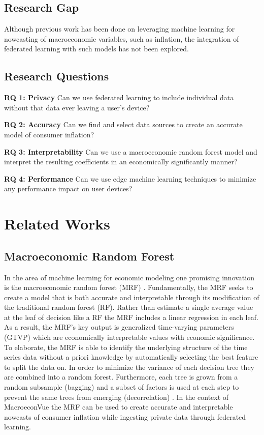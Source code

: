 \documentclass[conference]{IEEEtran}
\begin{document}
\subsection{Research Gap}
Although previous work has been done on leveraging machine learning for nowcasting of macroeconomic variables, such as inflation, the integration of federated learning with such models has not been explored.

\subsection{Research Questions}  
\textbf{RQ 1: Privacy} Can we use federated learning to include individual data without that data ever leaving a user's device?  

\textbf{RQ 2: Accuracy} Can we find and select data sources to create an accurate model of consumer inflation?  

\textbf{RQ 3: Interpretability} Can we use a macroeconomic random forest model and interpret the resulting coefficients in an economically significantly manner?  

\textbf{RQ 4: Performance} Can we use edge machine learning techniques to minimize any performance impact on user devices?  


\section{Related Works}
\subsection{Macroeconomic Random Forest}
In the area of machine learning for economic modeling one promising innovation is the macroeconomic random forest (MRF) \cite{macro_rf}. Fundamentally, the MRF seeks to create a model that is both accurate and interpretable through its modification of the traditional random forest (RF). Rather than estimate a single average value at the leaf of decision like a RF the MRF includes a linear regression in each leaf. As a result, the MRF's key output is generalized time-varying parameters (GTVP) which are economically interpretable values with economic significance. To elaborate, the MRF is able to identify the underlying structure of the time series data without a priori knowledge by automatically selecting the best feature to split the data on. In order to minimize the variance of each decision tree they are combined into a random forest. Furthermore, each tree is grown from a random subsample (bagging) and a subset of factors is used at each step to prevent the same trees from emerging (decorrelation) \cite{macro_rf}. In the context of MacroeconVue the MRF can be used to create accurate and interpretable nowcasts of consumer inflation while ingesting private data through federated learning. 
\end{document}
